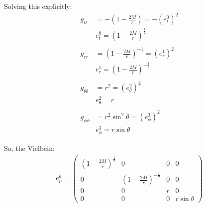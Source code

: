 \documentclass[12pt]{article}
\begin{document}
Solving this explicitly:
\begin{align*}
  g_{tt} &= -\left(1 - \frac{2M}{r}\right) = -(e^0_t)^2 \\
  &e^0_t = \left(1 - \frac{2M}{r}\right)^\frac{1}{2} \\ \\
  g_{rr} &= \left(1 - \frac{2M}{r}\right)^{-1} = (e^1_r)^2 \\
  &e^1_r = \left(1 - \frac{2M}{r}\right)^{-\frac{1}{2}} \\ \\
  g_{\theta\theta} &= r^2 = (e^2_\theta)^2 \\
  &e^2_\theta = r \\ \\
  g_{\phi\phi} &= r^2\sin^2{\theta} = (e^3_\phi)^2 \\
  &e^3_\phi = r\sin{\theta}
\end{align*}

So, the Vielbein:
\begin{align*}
  e^a_\mu = 
  \begin{pmatrix}
    \left(1 - \frac{2M}{r}\right)^\frac{1}{2} & 0 & 0 & 0 \\
    0 & \left(1 - \frac{2M}{r}\right)^{-\frac{1}{2}} & 0 & 0 \\
    0 & 0 & r & 0 \\
    0 & 0 & 0 & r\sin{\theta}
  \end{pmatrix}
\end{align*}
\end{document}
